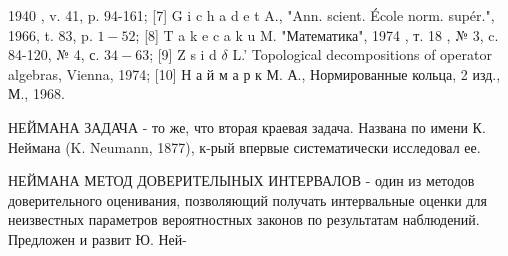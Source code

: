 \documentclass[10pt]{article}
\begin{document}
1940 , v. 41, p. 94-161; [7] G i c h a d e t A., "Ann. scient. École norm. supér.", 1966, t. 83, p. $1-52$; [8] T a k e c a k u M. "Математика", 1974 , т. 18 , № 3, c. 84-120, № 4, с. $34-63$; [9] $\mathrm{Z}$ s i d $\delta$ L.' Topological decompositions of operator algebras, Vienna, 1974; [10] Н а й м а р к М. А., Нормированные кольца, 2 изд., М., 1968.



НЕЙМАНА ЗАДАЧА - то же, что вторая краевая задача. Названа по имени К. Неймана (K. Neumann, 1877), к-рый впервые систематически исследовал ее.



НЕЙМАНА МЕТОД ДОВЕРИТЕЛЫНЫХ ИНТЕРВАЛОВ - один из методов доверительного оценивания, позволяющий получать интервальные оценки для неизвестных параметров вероятностных законов по результатам наблюдений. Предложен и развит Ю. Ней-
\end{document}
